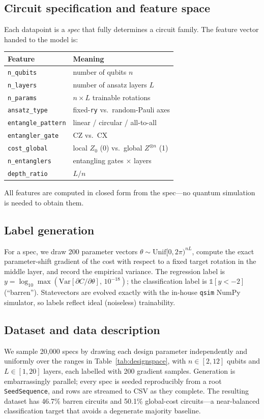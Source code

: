 \documentclass[journal]{IEEEtran}
\newcommand{\Nspecs}{20{,}000}                %
\newcommand{\Samples}{200}                    %
\newcommand{\QubitLo}{2}
\newcommand{\QubitHi}{12}
\newcommand{\LayerLo}{1}
\newcommand{\LayerHi}{20}
\newcommand{\GlobalFrac}{50.1}                  %
\newcommand{\BarrenFrac}{46.7}                  %
\begin{document}
\subsection{Circuit specification and feature space}
Each datapoint is a \emph{spec} that fully determines a circuit family. The
feature vector handed to the model is:
\begin{center}
\small
\begin{tabular}{@{}ll@{}}
\toprule
Feature & Meaning \\
\midrule
\texttt{n\_qubits} & number of qubits $n$ \\
\texttt{n\_layers} & number of ansatz layers $L$ \\
\texttt{n\_params} & $n\times L$ trainable rotations \\
\texttt{ansatz\_type} & fixed-\texttt{ry} vs.\ random-Pauli axes \\
\texttt{entangle\_pattern} & linear / circular / all-to-all \\
\texttt{entangler\_gate} & CZ vs.\ CX \\
\texttt{cost\_global} & local $Z_0$ (0) vs.\ global $Z^{\otimes n}$ (1) \\
\texttt{n\_entanglers} & entangling gates $\times$ layers \\
\texttt{depth\_ratio} & $L/n$ \\
\bottomrule
\end{tabular}
\end{center}
All features are computed in closed form from the spec---no quantum simulation is
needed to obtain them.

\subsection{Label generation}
For a spec, we draw \Samples{} parameter vectors $\theta\sim\mathrm{Unif}[0,2\pi)^{nL}$,
compute the exact parameter-shift gradient of the cost with respect to a fixed
target rotation in the middle layer, and record the empirical variance. The
regression label is $y=\log_{10}\max(\mathrm{Var}[\partial C/\partial\theta],\,10^{-18})$;
the classification label is $\mathbb{1}[y<-2]$ (``barren''). Statevectors are
evolved exactly with the in-house \texttt{qsim} NumPy simulator, so labels reflect
ideal (noiseless) trainability.

\subsection{Dataset and data description}
We sample \Nspecs{} specs by drawing each design parameter independently and
uniformly over the ranges in Table~\ref{tab:designspace}, with $n\in[\QubitLo,\QubitHi]$
qubits and $L\in[\LayerLo,\LayerHi]$ layers, each labelled with \Samples{} gradient
samples. Generation is embarrassingly parallel; every spec is seeded reproducibly
from a root \texttt{SeedSequence}, and rows are streamed to CSV as they complete.
The resulting dataset has \BarrenFrac{}\% barren circuits and \GlobalFrac{}\%
global-cost circuits---a near-balanced classification target that avoids a
degenerate majority baseline.
\end{document}
